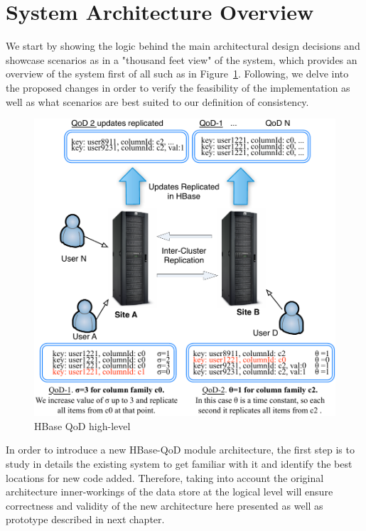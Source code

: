



\section{System Architecture Overview}\label{architecture:overview}
We start by showing the logic behind the main architectural design decisions and showcase scenarios as in a "thousand feet view" of the system, which provides an overview of the system first of all such as in Figure~\ref{fig-high-level}. Following, we delve into the proposed changes in order to verify the feasibility of the implementation as well as what scenarios are best suited to our definition of consistency.

\begin{figure}[h]
\centering
\includegraphics[width=0.8\linewidth]{figs/highlevel.pdf}
\caption{HBase QoD high-level}
\label{fig-high-level}
\end{figure}


In order to introduce a new HBase-QoD module architecture, the first step is to study in details the existing system to get familiar with it and identify the best locations for new code added. Therefore, taking into account the original architecture inner-workings of the data store at the logical level will ensure correctness and validity of the new architecture here presented as well as prototype described in next chapter.


